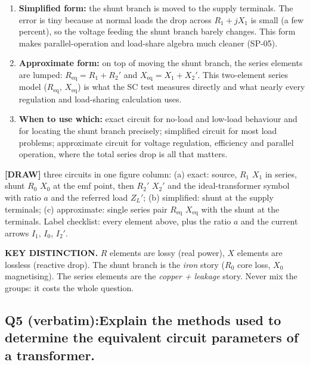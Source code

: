 \documentclass[11pt]{article}
\newcommand{\qhead}[2]{\subsection*{\color{copper}#1\quad\color{iron}#2}}
\newcommand{\keydist}[1]{\vspace{2pt}\textbf{\color{red}KEY DISTINCTION.} #1}
\newcommand{\drawline}[1]{\textbf{\color{muted}[DRAW]} #1}
\begin{document}
\begin{enumerate}[label=\arabic*.]
\item \textbf{Simplified form:} the shunt branch is moved to the supply terminals. The error is tiny because at normal loads the drop across $R_1 + jX_1$ is small (a few percent), so the voltage feeding the shunt branch barely changes. This form makes parallel-operation and load-share algebra much cleaner (SP-05).
\item \textbf{Approximate form:} on top of moving the shunt branch, the series elements are lumped: $R_{\text{eq}} = R_1 + R_2'$ and $X_{\text{eq}} = X_1 + X_2'$. This two-element series model ($R_{\text{eq}}$, $X_{\text{eq}}$) is what the SC test measures directly and what nearly every regulation and load-sharing calculation uses.
\item \textbf{When to use which:} exact circuit for no-load and low-load behaviour and for locating the shunt branch precisely; simplified circuit for most load problems; approximate circuit for voltage regulation, efficiency and parallel operation, where the total series drop is all that matters.
\end{enumerate}

\drawline{three circuits in one figure column: (a) exact: source, $R_1$ $X_1$ in series, shunt $R_0$ $X_0$ at the emf point, then $R_2'$ $X_2'$ and the ideal-transformer symbol with ratio $a$ and the referred load $Z_L'$; (b) simplified: shunt at the supply terminals; (c) approximate: single series pair $R_{\text{eq}}$ $X_{\text{eq}}$ with the shunt at the terminals. Label checklist: every element above, plus the ratio $a$ and the current arrows $I_1$, $I_0$, $I_2'$.}

\keydist{$R$ elements are lossy (real power), $X$ elements are lossless (reactive drop). The shunt branch is the \emph{iron} story ($R_0$ core loss, $X_0$ magnetising). The series elements are the \emph{copper + leakage} story. Never mix the groups: it costs the whole question.}

\qhead{Q5 (verbatim):}{Explain the methods used to determine the equivalent circuit parameters of a transformer.}
\end{document}
